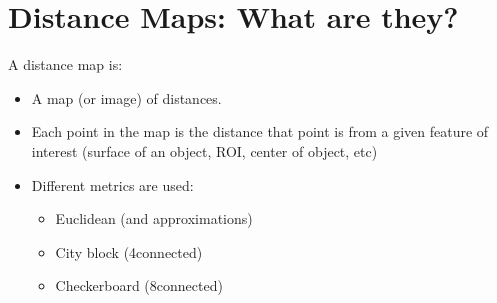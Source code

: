 \documentclass[letterpaper,10pt,english]{sphinxmanual}
\begin{document}
\chapter{Distance Maps: What are they?}
\label{\detokenize{06-AdvancedShapeAndTexture:distance-maps-what-are-they}}
\sphinxAtStartPar
A distance map is:
\begin{itemize}
\item {} 
\sphinxAtStartPar
A map (or image) of distances.

\item {} 
\sphinxAtStartPar
Each point in the map is the distance that point is from a given feature of interest (surface of an object, ROI, center of object, etc)

\item {} 
\sphinxAtStartPar
Different metrics are used:
\begin{itemize}
\item {} 
\sphinxAtStartPar
Euclidean (and approximations)

\item {} 
\sphinxAtStartPar
City block (4\sphinxhyphen{}connected)

\item {} 
\sphinxAtStartPar
Checkerboard (8\sphinxhyphen{}connected)

\end{itemize}

\end{itemize}
\end{document}
